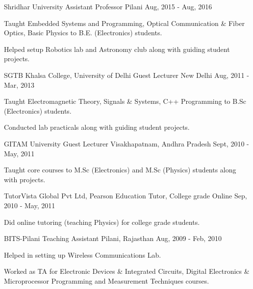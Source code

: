 \begin{cventries}
  \cventry
    {Shridhar University} %
    {Assistant Professor} %
    {Pilani} %
    {Aug, 2015 - Aug, 2016} %
    {
      \begin{cvitems} %
        \item {Taught Embedded Systems and Programming, Optical Communication \& Fiber Optics, Basic Physics to B.E. (Electronics) students.}
        \item {Helped setup Robotics lab and Astronomy club along with guiding student projects.}
      \end{cvitems}
    }
  \cventry
    {SGTB Khalsa College, University of Delhi} %
    {Guest Lecturer} %
    {New Delhi} %
    {Aug, 2011 - Mar, 2013} %
    {
      \begin{cvitems} %
        \item {Taught Electromagnetic Theory, Signals \& Systems, C++ Programming to B.Sc (Electronics) students.}
        \item {Conducted lab practicals along with guiding student projects.}
      \end{cvitems}
    }

  \cventry
    {GITAM University} %
    {Guest Lecturer} %
    {Visakhapatnam, Andhra Pradesh} %
    {Sept, 2010 - May, 2011} %
    {
      \begin{cvitems} %
        \item {Taught core courses to M.Sc (Electronics) and M.Sc (Physics) students along with projects.}
      \end{cvitems}
    }
  \cventry
    {TutorVista Global Pvt Ltd, Pearson Education} %
    {Tutor, College grade} %
    {Online} %
    {Sep, 2010 - May, 2011} %
    {
      \begin{cvitems} %
        \item {Did online tutoring (teaching Physics) for college grade students.}
      \end{cvitems}
    }

  \cventry
    {BITS-Pilani} %
    {Teaching Assistant} %
    {Pilani, Rajasthan} %
    {Aug, 2009 - Feb, 2010} %
    {
      \begin{cvitems} %
        \item {Helped in setting up Wireless Communications Lab.}
        \item {Worked as TA for Electronic Devices \& Integrated Circuits, Digital Electronics \& Microprocessor Programming and Measurement Techniques courses.}
      \end{cvitems}
    }


\end{cventries}
